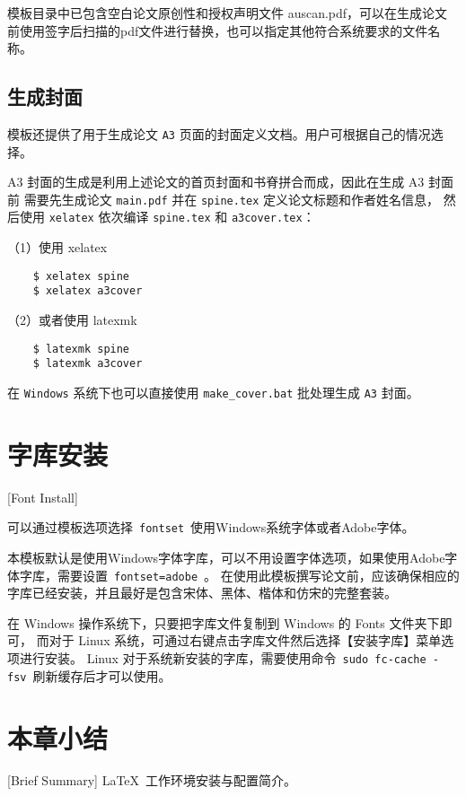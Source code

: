 模板目录中已包含空白论文原创性和授权声明文件 auscan.pdf，可以在生成论文前使用签字后扫描的pdf文件进行替换，也可以指定其他符合系统要求的文件名称。

\subsection{生成封面}
\label{sec:generate-cover}

模板还提供了用于生成论文 \texttt{A3} 页面的封面定义文档。用户可根据自己的情况选择。

A3 封面的生成是利用上述论文的首页封面和书脊拼合而成，因此在生成 A3 封面前
需要先生成论文 \texttt{main.pdf} 并在 \texttt{spine.tex} 定义论文标题和作者姓名信息，
然后使用 \texttt{xelatex} 依次编译 \texttt{spine.tex} 和 \texttt{a3cover.tex}：

（1）使用 xelatex

\begin{lstlisting}
    $ xelatex spine
    $ xelatex a3cover
\end{lstlisting}

（2）或者使用 latexmk

\begin{lstlisting}
    $ latexmk spine
    $ latexmk a3cover
\end{lstlisting}

在 \texttt{Windows} 系统下也可以直接使用 \texttt{make\_cover.bat} 批处理生成 \texttt{A3} 封面。

\section{字库安装}[Font Install]

可以通过模板选项选择~\texttt{fontset}~使用Windows系统字体或者Adobe字体。

本模板默认是使用Windows字体字库，可以不用设置字体选项，如果使用Adobe字体字库，需要设置~\texttt{fontset=adobe}~。
在使用此模板撰写论文前，应该确保相应的字库已经安装，并且最好是包含宋体、黑体、楷体和仿宋的完整套装。

在 Windows 操作系统下，只要把字库文件复制到 Windows 的 Fonts 文件夹下即可，
而对于 Linux 系统，可通过右键点击字库文件然后选择【安装字库】菜单选项进行安装。
Linux 对于系统新安装的字库，需要使用命令~\texttt{sudo fc-cache -fsv}~刷新缓存后才可以使用。

\section*{本章小结}[Brief Summary]
\LaTeX{}~工作环境安装与配置简介。
